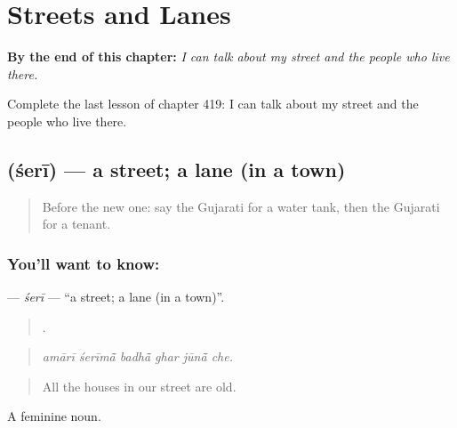 
\chapter{Streets and Lanes}
\label{ch:gu-streets-and-lanes}

\begin{chapteropening}
\textbf{By the end of this chapter:} \emph{I can talk about my street and the people who live there.}

Complete the last lesson of chapter 419: I can talk about my street and the people who live there.
\end{chapteropening}

\section[\texorpdfstring{\gu{શેરી} (śerī)}{શેરી (śerī)}]{ (śerī) — a street; a lane (in a town)}

\label{lesson:GU-C419-seri}



\begin{quote}
Before the new one: say the Gujarati for a water tank, then the Gujarati for a tenant.
\end{quote}

\subsection*{You'll want to know: }
\textbf{} — \emph{śerī} — \textquotedblleft{}a street; a lane (in a town)\textquotedblright{}.

\begin{quote}
     .
\end{quote}

\begin{quote}
\emph{amārī śerīmā̃ badhā̃ ghar jūnā̃ che.}
\end{quote}

\begin{quote}
All the houses in our street are old.
\end{quote}

A feminine noun.

